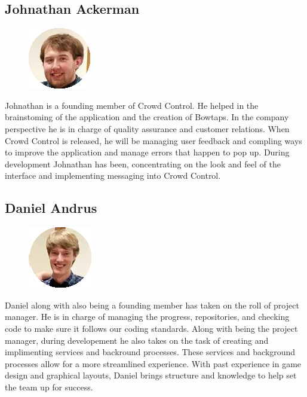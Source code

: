 \subsection{Johnathan Ackerman}
\begin{minipage}[t]{\linewidth}%
\begin{figure}
\includegraphics{johnnathonackerman}
\end{figure}
Johnathan is a founding member of Crowd Control. He helped in the brainstoming of the application and the creation of Bowtaps. In the company perspective he is in charge of quality assurance and customer relations. When Crowd Control is released, he will be managing user feedback and compling ways to improve the application and manage errors that happen to pop up. During development Johnathan has been, concentrating on the look and feel of the interface and implementing messaging into Crowd Control. 
\newline
\newline
\newline
\end{minipage}



\noindent
\subsection{Daniel Andrus}
\begin{minipage}[t]{\linewidth}%
\begin{figure}
\includegraphics{danielandrus}
\end{figure}
Daniel along with also being a founding member has taken on the roll of project manager. He is in charge of managing the progress, repositories, and checking code to make sure it follows our coding standards. Along with being the project manager, during developement he also takes on the task of creating and implimenting services and backround processes. These services and background processes allow for a more streamlined experience. With past experience in game design and graphical layouts, Daniel brings structure and knowledge to help set the team up for success.
\newline
\newline
\newline
\end{minipage}

